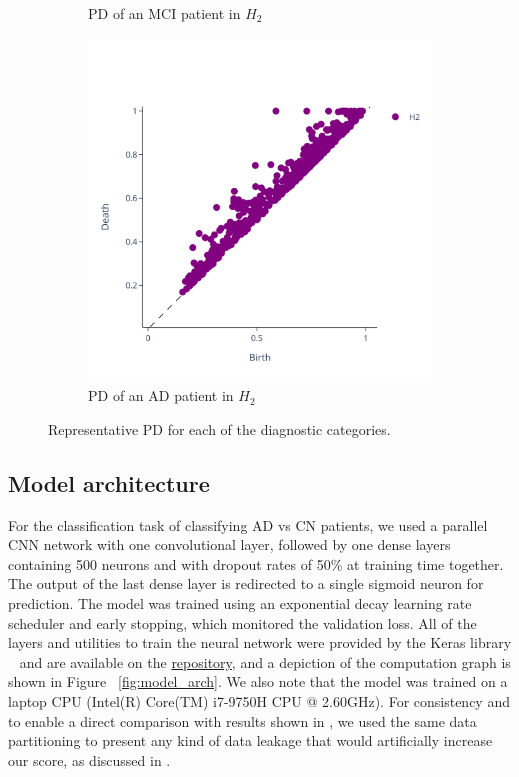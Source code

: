 \documentclass{article}
\begin{document}
\begin{figure}
\begin{subfigure}{0.32\textwidth}
    \caption{PD of an MCI patient in $H_2$}
  \end{subfigure}
  \begin{subfigure}{0.32\textwidth}
    \includegraphics[width=\textwidth]{figures/PDs/persistence_diagram_AD_H_2.png}
    \caption{PD of an AD patient in $H_2$}
  \end{subfigure}
  \caption{Representative PD for each of the diagnostic categories.}
  \label{fig:sample_rep_pd}
\end{figure}


\subsection{Model architecture}
For the classification task of classifying AD vs CN patients, we used a parallel
CNN network with one convolutional layer,
followed by one dense layers containing 500 neurons and with dropout rates of 50\% at training time
together. The output of the last dense layer is redirected to a single sigmoid neuron for
prediction. The model was trained using an exponential decay learning rate scheduler and early
stopping, which monitored the validation loss. All of the layers and utilities to train the neural
network were provided by the Keras library ~\citep{chollet2015keras} and are available on the
\href{https://github.com/pjhartout/TDA_ADNI_MLCB}{repository}, and a depiction of the computation
graph is shown in Figure ~\ref{fig:model_arch}. We also note that the model was trained on a laptop
CPU (Intel(R) Core(TM) i7-9750H CPU @ 2.60GHz). For consistency and to enable a
direct comparison with results shown in \citep{bruningk2020image}, we used the
same data partitioning to present any kind of data leakage that would
artificially increase our score, as discussed in \citep{wen2020convolutional}.
\end{document}
